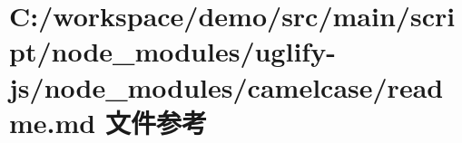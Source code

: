 \hypertarget{node__modules_2uglify-js_2node__modules_2camelcase_2_r_e_a_d_m_e_8md}{}\section{C\+:/workspace/demo/src/main/script/node\+\_\+modules/uglify-\/js/node\+\_\+modules/camelcase/readme.md 文件参考}
\label{node__modules_2uglify-js_2node__modules_2camelcase_2_r_e_a_d_m_e_8md}
